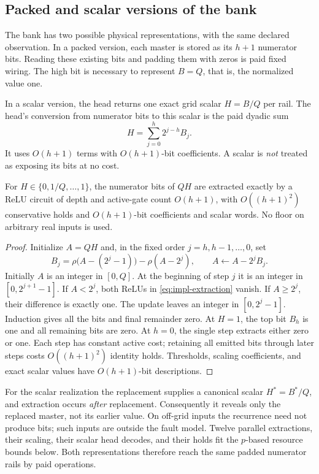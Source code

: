 \subsection{Packed and scalar versions of the bank}\label{sec:impl-extraction}

The bank has two possible physical representations, with the same declared
observation. In a packed version, each master is stored as its $h+1$
numerator bits. Reading these existing bits and padding them with zeros
is paid fixed wiring. The high bit is necessary to represent $B=Q$, that
is, the normalized value one.

In a scalar version, the head returns one exact grid scalar
$H=B/Q$ per rail. The head's conversion from numerator bits to this
scalar is the paid dyadic sum
\[
 H=\sum_{j=0}^{h}2^{j-h}B_j.
\]
It uses $O(h+1)$ terms with $O(h+1)$-bit coefficients. A scalar is
\emph{not} treated as exposing its bits at no cost.

\begin{lemma}
\label{lem:impl-extraction}
For $H\in\{0,1/Q,\ldots,1\}$, the numerator bits of $QH$ are extracted
exactly by a ReLU circuit of depth and active-gate count $O(h+1)$, with
$O((h+1)^2)$ conservative holds and $O(h+1)$-bit coefficients and scalar
words. No floor on arbitrary real inputs is used.
\end{lemma}
\begin{proof}
Initialize $A=QH$ and, in the fixed order $j=h,h-1,\ldots,0$, set
\begin{equation}\label{eq:impl-extraction}
 B_j=\rho\bigl(A-(2^j-1)\bigr)-\rho(A-2^j),\qquad
 A\leftarrow A-2^jB_j.
\end{equation}
Initially $A$ is an integer in $[0,Q]$. At the beginning of step $j$ it
is an integer in $[0,2^{j+1}-1]$. If $A<2^j$, both ReLUs in
\eqref{eq:impl-extraction} vanish. If $A\ge2^j$, their difference is
exactly one. The update leaves an integer in $[0,2^j-1]$. Induction gives
all the bits and final remainder zero. At $H=1$, the top bit $B_h$ is
one and all remaining bits are zero. At $h=0$, the single step extracts
either zero or one. Each step has constant active cost; retaining all
emitted bits through later steps costs $O((h+1)^2)$ identity holds.
Thresholds, scaling coefficients, and exact scalar values have
$O(h+1)$-bit descriptions.
\end{proof}

For the scalar realization the replacement supplies a canonical scalar
$H^*=B^*/Q$, and extraction occurs \emph{after} replacement. Consequently
it reveals only the replaced master, not its earlier value. On off-grid
inputs the recurrence need not produce bits; such inputs are outside the
fault model. Twelve parallel extractions, their scaling, their scalar
head decodes, and their holds fit the $p$-based resource bounds below.
Both representations therefore reach the same padded numerator rails
by paid operations.

